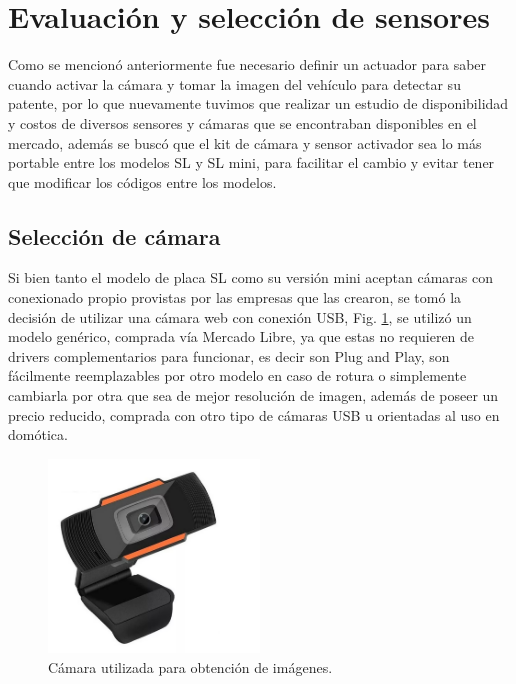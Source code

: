 \section{Evaluación y selección de sensores}
Como se mencionó anteriormente fue necesario definir un actuador para saber cuando activar la cámara y tomar la imagen del vehículo 
para detectar su patente, por lo que nuevamente tuvimos que realizar un estudio de disponibilidad y costos de diversos sensores y cámaras que se 
encontraban disponibles en el mercado, además se buscó que el kit de cámara y sensor activador sea lo más portable entre los modelos SL y SL 
mini, para facilitar el cambio y evitar tener que modificar los códigos entre los modelos.
\subsection{Selección de cámara}
Si bien tanto el modelo de placa SL como su versión mini aceptan cámaras con conexionado propio provistas por las empresas que las crearon,
se tomó la decisión de utilizar una cámara web con conexión USB, Fig. \ref{fig:camara-usb}, se utilizó un modelo genérico, comprada vía Mercado 
Libre, ya que estas no requieren de drivers complementarios para funcionar, es decir son Plug and Play, son fácilmente reemplazables 
por otro modelo en caso de rotura o simplemente cambiarla por otra que sea de mejor resolución de imagen, además de poseer un precio reducido, 
comprada con otro tipo de cámaras USB u orientadas al uso en domótica.
\begin{figure}
    \centering
    \includegraphics[width=0.5\textwidth]{imgs/camara-usb.jpg}
    \caption{Cámara utilizada para obtención de imágenes.}
    \label{fig:camara-usb}
\end{figure}

